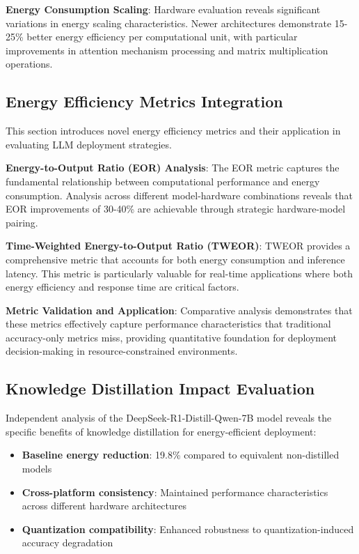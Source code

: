 \documentclass[sigconf]{acmart}
\begin{document}
\textbf{Energy Consumption Scaling}: Hardware evaluation reveals significant variations in energy scaling characteristics. Newer architectures demonstrate 15-25\% better energy efficiency per computational unit, with particular improvements in attention mechanism processing and matrix multiplication operations.

\subsection{Energy Efficiency Metrics Integration}

This section introduces novel energy efficiency metrics and their application in evaluating LLM deployment strategies.

\textbf{Energy-to-Output Ratio (EOR) Analysis}: The EOR metric captures the fundamental relationship between computational performance and energy consumption. Analysis across different model-hardware combinations reveals that EOR improvements of 30-40\% are achievable through strategic hardware-model pairing.

\textbf{Time-Weighted Energy-to-Output Ratio (TWEOR)}: TWEOR provides a comprehensive metric that accounts for both energy consumption and inference latency. This metric is particularly valuable for real-time applications where both energy efficiency and response time are critical factors.

\textbf{Metric Validation and Application}: Comparative analysis demonstrates that these metrics effectively capture performance characteristics that traditional accuracy-only metrics miss, providing quantitative foundation for deployment decision-making in resource-constrained environments.

\subsection{Knowledge Distillation Impact Evaluation}

Independent analysis of the DeepSeek-R1-Distill-Qwen-7B model reveals the specific benefits of knowledge distillation for energy-efficient deployment:

\begin{itemize}
\item \textbf{Baseline energy reduction}: 19.8\% compared to equivalent non-distilled models
\item \textbf{Cross-platform consistency}: Maintained performance characteristics across different hardware architectures
\item \textbf{Quantization compatibility}: Enhanced robustness to quantization-induced accuracy degradation
\end{itemize}
\end{document}
